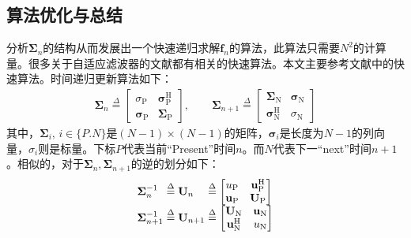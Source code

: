 \subsection{算法优化与总结}
分析$\boldsymbol{\Sigma}_n$的结构从而发展出一个快速递归求解$\mathbf{f}_n$的算法，此算法只需要$N^2$的计算量。很多关于自适应滤波器的文献\cite{Simon2001,strobach1986}都有相关的快速算法。本文主要参考文献中的快速算法。时间递归更新算法如下：
\begin{eqnarray}
    \boldsymbol{\Sigma}_n\overset{\Delta}{=}
    \begin{bmatrix}
        \sigma_{\mathrm{P}}&\boldsymbol{\sigma}_{\mathrm{P}}^{\mathrm{H}}\\
        \boldsymbol{\sigma}_{\mathrm{P}}&\boldsymbol{\Sigma}_{\mathrm{P}}
    \end{bmatrix}
    ,\qquad
    \boldsymbol{\Sigma}_{n+1}\overset{\Delta}{=}
    \begin{bmatrix}
        \boldsymbol{\Sigma}_{\mathrm{N}}&\boldsymbol{\sigma}_{\mathrm{N}}\\
        \boldsymbol{\sigma}_{\mathrm{N}}^{\mathrm{H}}&\sigma_{\mathrm{N}}
    \end{bmatrix}
    \label{equ:3.24}
\end{eqnarray}
其中，$\boldsymbol{\Sigma}_i,\,i\in\{P.N\}$是$(N-1)\times(N-1)$的矩阵，$\boldsymbol{\sigma}_i$是长度为$N-1$的列向量，$\sigma_i$则是标量。下标$P$代表当前“Present”时间$n$。而$N$代表下一“next”时间$n+1$。相似的，对于$\boldsymbol{\Sigma}_n,\boldsymbol{\Sigma}_{n+1}$的逆的划分如下：
\begin{eqnarray}
    \begin{array}{l@{\;\overset{\Delta}{=}\;}l@{\;\overset{\Delta}{=}\;}l}
        \boldsymbol{\Sigma}_n^{-1}&\mathbf{U}_n&
        \begin{bmatrix}
            u_{\mathrm{P}}&\mathbf{u}_{\mathrm{P}}^{\mathrm{H}}\\
            \mathbf{u}_{\mathrm{P}}&\mathbf{U}_{\mathrm{P}}\\
        \end{bmatrix}\\
        \boldsymbol{\Sigma}_{n+1}^{-1}&\mathbf{U}_{n+1}&
        \begin{bmatrix}
            \mathbf{U}_{\mathrm{N}}&\mathbf{u}_{\mathrm{N}}\\
            \mathbf{u}_{\mathrm{N}}^{\mathrm{H}}&u_{\mathrm{N}}
        \end{bmatrix}
    \end{array}
    \label{equ:3.25}
\end{eqnarray}
